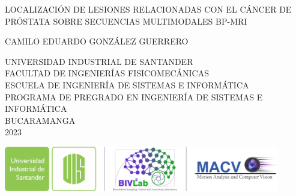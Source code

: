 
\thispagestyle{empty}

\begin{center}

LOCALIZACIÓN DE LESIONES RELACIONADAS CON EL CÁNCER DE PRÓSTATA SOBRE SECUENCIAS MULTIMODALES BP-MRI

\vspace{5cm}

CAMILO EDUARDO GONZÁLEZ GUERRERO\\
\vspace{5cm}

UNIVERSIDAD INDUSTRIAL DE SANTANDER\\
FACULTAD DE INGENIERÍAS FISICOMECÁNICAS\\
ESCUELA DE INGENIERÍA DE SISTEMAS E INFORMÁTICA\\
PROGRAMA DE PREGRADO EN INGENIERÍA DE SISTEMAS E INFORMÁTICA\\
BUCARAMANGA\\
2023\\
\end{center}\vspace{1cm}

\begin{center}
\includegraphics[width=0.9\textwidth]{imgs/logos.png}
\end{center}


\newpage
\thispagestyle{empty}

